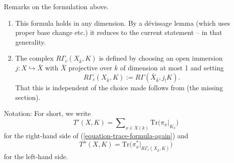 \begin{remark}
\label{remark-on-trace-formula-again}
Remarks on the formulation above.
\begin{enumerate}
\item
This formula holds in any dimension. By a d\'evissage lemma (which uses proper
base change etc.) it reduces to the current statement -- in that generality.
\item
The complex $R\Gamma_c(X_{\bar k}, K)$ is defined by choosing an open immersion
$j: X \hookrightarrow \bar X$ with $\bar X$ projective over $k$ of dimension at
most 1 and setting
$$
R\Gamma_c(X_{\bar k}, K) := R\Gamma(\bar X_{\bar k}, j_!K).
$$
That this is independent of the choice made follows from (the missing section).
\end{enumerate}
\end{remark}

\noindent
Notation:
For short, we write
$$
T'(X, K) =
\sum\nolimits_{x\in X(k)}
\text{Tr}\big(\pi_x\big|_{K_{\bar x}}\big)
$$
for the right-hand side of (\ref{equation-trace-formula-again}) and
$$
T''(X, K)
=\text{Tr}\big(\pi_x^*\big|_{R\Gamma_c(X_{\bar k}, K)}\big)
$$
for the left-hand side.

